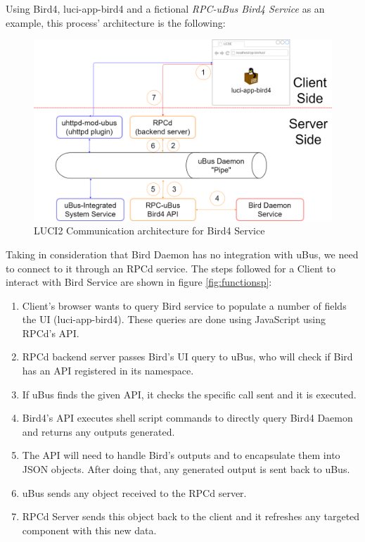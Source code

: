 Using Bird4, luci-app-bird4 and a fictional \textit{RPC-uBus Bird4 Service} as an example, this process' architecture is the following:

\begin{figure}[H]
    \centering
    \includegraphics[width=\textwidth]{images/luci2/luci2d}
    \caption{LUCI2 Communication architecture for Bird4 Service}
    \label{fig:luci2arch}
\end{figure}

Taking in consideration that Bird Daemon has no integration with uBus, we need to connect to it through an RPCd service. The steps followed for a Client to interact with Bird Service are shown in figure \ref{fig:functionsp}:
\begin{enumerate}
    \item Client's browser wants to query Bird service to populate a number of fields the UI (luci-app-bird4). These queries are done using JavaScript using RPCd's API.
    \item RPCd backend server passes Bird's UI query to uBus, who will check if Bird has an API registered in  its namespace.
    \item If uBus finds the given API, it checks the specific call sent and it is executed.
    \item Bird4's API executes shell script commands to directly query Bird4 Daemon and returns any outputs generated.
    \item The API will need to handle Bird's outputs and to encapsulate them into JSON objects. After doing that, any generated output is sent back to uBus.
    \item uBus sends any object received to the RPCd server.
    \item RPCd Server sends this object back to the client and it refreshes any targeted component with this new data.
\end{enumerate}

